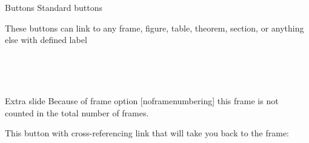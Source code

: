 \documentclass[11pt,t]{beamer}
\begin{document}
\begin{frame}[label=buttons]{Buttons}
Standard buttons

	\hyperlink{fig:figure1}{}

	\hyperlink{extraframe}{}


	\beamerreturnbutton{}

\vspace{11pt}
These buttons can link to any frame, figure, table, theorem, section, or anything else with defined label
\end{frame}




\begin{frame}

\centering
\textcolor{white}{Ending frame (version 1)}
\end{frame}




\begin{frame}

\centering
\textcolor{white}{Ending frame (version 2)}
\end{frame}



\appendix
\begin{frame}[noframenumbering,label=extraframe]{Extra slide}
Because of frame option [noframenumbering] this frame is not counted in the total number of frames.

\vspace{24pt}
This button with cross-referencing link that will take you back to the frame: 

\hyperlink{buttons}{}
\end{frame}
\end{document}
